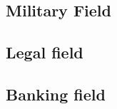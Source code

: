 \subsection{Military Field}
\label{subsec:military}
\newline

\subsection{Legal field}
\label{subsec:legal}
\newline

\subsection{Banking field}
\label{subsec:banking}
\newline